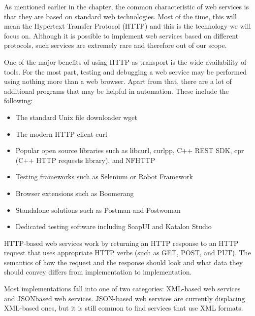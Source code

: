 
As mentioned earlier in the chapter, the common characteristic of web services is that they are based on standard web technologies. Most of the time, this will mean the Hypertext Transfer Protocol (HTTP) and this is the technology we will focus on. Although it is possible to implement web services based on different protocols, such services are extremely rare and therefore out of our scope.


One of the major benefits of using HTTP as transport is the wide availability of tools. For the most part, testing and debugging a web service may be performed using nothing more than a web browser. Apart from that, there are a lot of additional programs that may be helpful in automation. These include the following:

\begin{itemize}
\item 
The standard Unix file downloader wget

\item 
The modern HTTP client curl

\item 
Popular open source libraries such as libcurl, curlpp, C++ REST SDK, cpr (C++ HTTP requests library), and NFHTTP

\item 
Testing frameworks such as Selenium or Robot Framework

\item 
Browser extensions such as Boomerang

\item 
Standalone solutions such as Postman and Postwoman

\item 
Dedicated testing software including SoapUI and Katalon Studio
\end{itemize}

HTTP-based web services work by returning an HTTP response to an HTTP request that uses appropriate HTTP verbs (such as GET, POST, and PUT). The semantics of how the request and the response should look and what data they should convey differs from implementation to implementation.

Most implementations fall into one of two categories: XML-based web services and JSONbased web services. JSON-based web services are currently displacing XML-based ones, but it is still common to find services that use XML formats.

